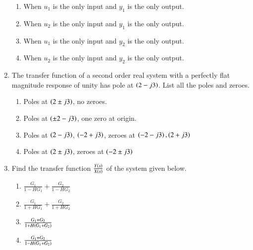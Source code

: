 \documentclass[journal]{IEEEtran}
\begin{document}
\begin{enumerate}
    \begin{enumerate}
        \item When $u_1$ is the only input and $y_1$ is the only output.
        \item When $u_2$ is the only input and $y_1$ is the only output.
        \item When $u_1$ is the only input and $y_2$ is the only output.
        \item When $u_2$ is the only input and $y_2$ is the only output.
    \end{enumerate}

    \item The transfer function of a second order real system with a perfectly flat magnitude response of unity has pole at $\left(2-j3\right)$. List all the poles and zeroes.
        \begin{enumerate}
            \item Poles at $\left(2 \pm j3\right)$, no zeroes.
            \item Poles at $\left(\pm 2 - j3\right)$, one zero at origin.
            \item Poles at $\left(2 - j3\right)$, $\left(-2 + j3\right)$, zeroes at $\left(-2-j3\right), \left(2+j3\right)$
            \item Poles at $\left(2 \pm j3\right)$, zeroes at $\left(-2 \pm j3\right)$
        \end{enumerate}

    \item Find the transfer function $\frac{Y\left(s\right)}{X\left(s\right)}$ of the system given below.
    
        \begin{figure}[H]
            \centering
            
            \caption{}
            \label{fig64}
        \end{figure}

        \begin{enumerate}
            \item $\frac{G_1}{1-H G_1} + \frac{G_2}{1-H G_2}$
            \item $\frac{G_1}{1+H G_1} + \frac{G_2}{1+H G_2}$
            \item $\frac{G_1 + G_2}{ 1 + H \left(G_1 + G_2\right)}$
            \item $\frac{G_1 + G_2}{ 1 - H \left(G_1 + G_2\right)}$
        \end{enumerate}


\end{enumerate}
\end{document}
